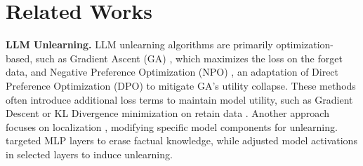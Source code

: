\section{Related Works} 
\textbf{LLM Unlearning.} LLM unlearning algorithms are primarily optimization-based, such as Gradient Ascent (GA) \citep{thudi2022unrolling}, which maximizes the loss on the forget data, and Negative Preference Optimization (NPO) \citep{zhang2024negative}, an adaptation of Direct Preference Optimization (DPO) \citep{rafailov2024direct} to mitigate GA’s utility collapse. These methods often introduce additional loss terms to maintain model utility, such as Gradient Descent or KL Divergence minimization on retain data \citep{yao2023large,maini2024tofu,shi2024muse, liu2024rethinking,fan2025towards,yang2024cliperase,zhuang2024uoe}. Another approach focuses on localization \citep{liu2024rethinking}, modifying specific model components for unlearning. \citet{wang2024large} targeted MLP layers to erase factual knowledge, while \citet{li2024wmdp} adjusted model activations in selected layers to induce unlearning.




